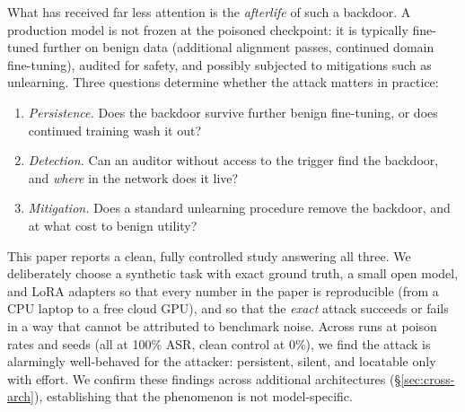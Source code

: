 \documentclass[11pt]{article}
\begin{document}
What has received far less attention is the \emph{afterlife} of such a
backdoor. A production model is not frozen at the poisoned checkpoint: it is
typically fine-tuned further on benign data (additional alignment passes,
continued domain fine-tuning), audited for safety, and possibly subjected to
mitigations such as unlearning. Three questions determine whether the attack
matters in practice:

\begin{enumerate}[label=\textbf{Q\arabic*.}, leftmargin=2.2em]
  \item \emph{Persistence.} Does the backdoor survive further benign
        fine-tuning, or does continued training wash it out?
  \item \emph{Detection.} Can an auditor without access to the trigger find
        the backdoor, and \emph{where} in the network does it live?
  \item \emph{Mitigation.} Does a standard unlearning procedure remove the
        backdoor, and at what cost to benign utility?
\end{enumerate}

This paper reports a clean, fully controlled study answering all three. We
deliberately choose a synthetic task with exact ground truth, a small open
model, and LoRA adapters so that every number in the paper is reproducible
(from a CPU laptop to a free cloud GPU), and so that the \emph{exact} attack
succeeds or fails in a way that cannot be attributed to benchmark noise.
Across \nTotalRuns{} runs at \nRates{} poison rates and \nSeeds{} seeds
(all at 100\% ASR, clean control at 0\%), we find the attack is
alarmingly well-behaved for the attacker: persistent, silent, and
locatable only with effort. We confirm these findings across
\nCrossModels{} additional architectures (\S\ref{sec:cross-arch}),
establishing that the phenomenon is not model-specific.
\end{document}
